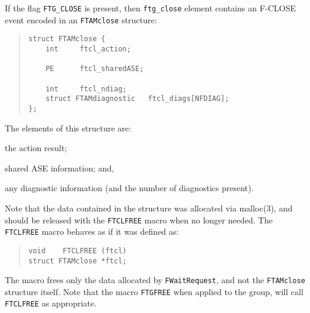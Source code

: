 If the flag \verb"FTG_CLOSE" is present,
then \verb"ftg_close" element contains an {\sf F-CLOSE\/} event encoded in an
\verb"FTAMclose" structure:
\begin{quote}\small\begin{verbatim}
struct FTAMclose {
    int     ftcl_action;

    PE      ftcl_sharedASE;

    int     ftcl_ndiag;
    struct FTAMdiagnostic   ftcl_diags[NFDIAG];
};
\end{verbatim}\end{quote}
The elements of this structure are:
\begin{describe}
\item[\verb"ftcl\_action":] the action result;

\item[\verb"ftcl\_sharedASE":] shared ASE information;
and,

\item[\verb"ftcl\_diags"/\verb"ftcl\_ndiag":] any diagnostic information
(and the number of diagnostics present).
\end{describe}
Note that the data contained in the structure was allocated via \man malloc(3),
and should be released with the \verb"FTCLFREE" macro when no longer needed.
The \verb"FTCLFREE" macro
behaves as if it was defined as:
\begin{quote}\small\begin{verbatim}
void    FTCLFREE (ftcl)
struct FTAMclose *ftcl;
\end{verbatim}\end{quote}
The macro frees only the data allocated by \verb"FWaitRequest",
and not the \verb"FTAMclose" structure itself.
Note that the macro \verb"FTGFREE" when applied to the group,
will call \verb"FTCLFREE" as appropriate.

